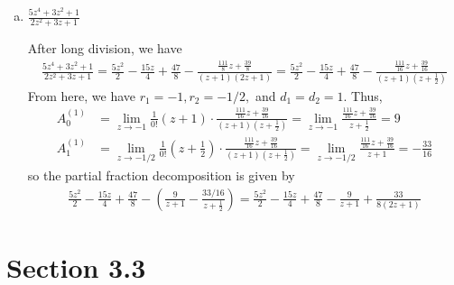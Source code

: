 \documentclass{article}
\begin{document}
\begin{itemize}
\begin{enumerate}[(a)]
			\item $\frac{5z^4+3z^2+1}{2z^2+3z+1}$
				\begin{soln}
					After long division, we have
					\begin{align*}
						\frac{5z^4+3z^2+1}{2z^2+3z+1} = \frac{5z^2}{2} -\frac{15z}{4} + \frac{47}{8} - \frac{\frac{111}{8}z + \frac{39}{8}}{(z+1)(2z+1)} = \frac{5z^2}{2} - \frac{15z}{4} + \frac{47}{8} - \frac{\frac{111}{16}z + \frac{39}{16}}{(z+1)\left( z+\frac{1}{2} \right)}
					\end{align*}
					From here, we have $r_1=-1, r_2=-1/2,$ and $d_1=d_2=1.$ Thus,
					\begin{align*}
						A_0^{(1)} &= \lim_{z\to-1} \frac{1}{0!} (z+1)\cdot \frac{\frac{111}{16}z + \frac{39}{16}}{(z+1)\left( z+\frac{1}{2} \right)} = \lim_{z\to -1} \frac{\frac{111}{16}z + \frac{39}{16}}{z+\frac{1}{2}} = 9 \\
						A_1^{(1)} &= \lim_{z\to -1/2} \frac{1}{0!} \left( z+\frac{1}{2} \right)\cdot \frac{\frac{111}{16}z + \frac{39}{16}}{(z+1)\left( z+\frac{1}{2} \right)} = \lim_{z\to-1/2} \frac{\frac{111}{16}z + \frac{39}{16}}{z+1} = -\frac{33}{16}
					\end{align*}
					so the partial fraction decomposition is given by
					\begin{align*}
						\frac{5z^2}{2} - \frac{15z}{4} + \frac{47}{8} - \left( \frac{9}{z+1} - \frac{33/16}{z+\frac{1}{2}} \right) = \frac{5z^2}{2} - \frac{15z}{4} + \frac{47}{8} - \frac{9}{z+1} + \frac{33}{8(2z+1)}
					\end{align*}
				\end{soln}

		\end{enumerate}
		
\end{itemize}

\section*{Section 3.3}
\end{document}
